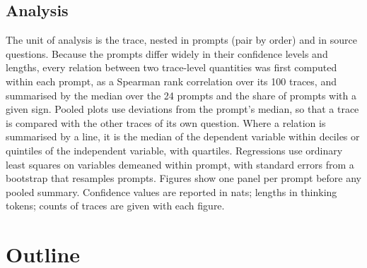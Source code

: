 \documentclass[11pt]{article}
\begin{document}
\subsection{Analysis}

The unit of analysis is the trace, nested in prompts (pair by order) and in source questions. Because the prompts differ widely in their confidence levels and lengths, every relation between two trace-level quantities was first computed within each prompt, as a Spearman rank correlation over its 100 traces, and summarised by the median over the 24 prompts and the share of prompts with a given sign. Pooled plots use deviations from the prompt's median, so that a trace is compared with the other traces of its own question. Where a relation is summarised by a line, it is the median of the dependent variable within deciles or quintiles of the independent variable, with quartiles. Regressions use ordinary least squares on variables demeaned within prompt, with standard errors from a bootstrap that resamples prompts. Figures show one panel per prompt before any pooled summary. Confidence values are reported in nats; lengths in thinking tokens; counts of traces are given with each figure.

\section*{Outline}
\end{document}
